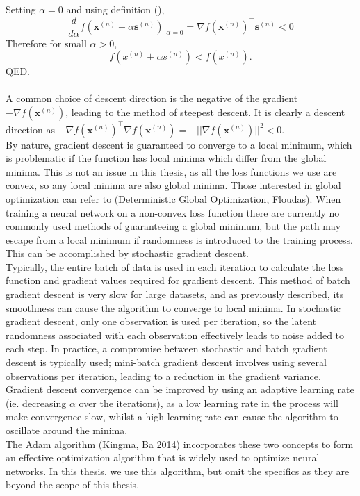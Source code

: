 \documentclass[a4paper,12pt]{article}
\numberwithin{equation}{section}
\begin{document}
Setting $\alpha=0$ and using definition (),
\[\frac{d}{d\alpha}f(\bm{x}^{(n)}+\alpha\bm{s}^{(n)})|_{\alpha=0}=\nabla f(\bm{x}^{(n)})^\top \bm{s}^{(n)}<0\]
Therefore for small $\alpha>0$,
\[f(x^{(n)}+\alpha s^{(n)})<f(x^{(n)}).\]
QED.\\
\\
A common choice of descent direction is the negative of the gradient $-\nabla f(\bm{x}^{(n)})$, leading to the method of steepest descent. It is clearly a descent direction as $-\nabla f(\bm{x}^{(n)})^\top\nabla f(\bm{x}^{(n)})=-||\nabla f(\bm{x}^{(n)})||^2<0$.\\
By nature, gradient descent is guaranteed to converge to a local minimum, which is problematic if the function has local minima which differ from the global minima. This is not an issue in this thesis, as all the loss functions we use are convex, so any local minima are also global minima. Those interested in global optimization can refer to (Deterministic Global Optimization, Floudas). When training a neural network on a non-convex loss function there are currently no commonly used methods of guaranteeing a global minimum, but the path may escape from a local minimum if randomness is introduced to the training process. This can be accomplished by stochastic gradient descent.\\
Typically, the entire batch of data is used in each iteration to calculate the loss function and gradient values required for gradient descent. This method of batch gradient descent is very slow for large datasets, and as previously described, its smoothness can cause the algorithm to converge to local minima. In stochastic gradient descent, only one observation is used per iteration, so the latent randomness associated with each observation effectively leads to noise added to each step. In practice, a compromise between stochastic and batch gradient descent is typically used; mini-batch gradient descent involves using several observations per iteration, leading to a reduction in the gradient variance.\\
Gradient descent convergence can be improved by using an adaptive learning rate (ie. decreasing $\alpha$ over the iterations), as a low learning rate in the process will make convergence slow, whilst a high learning rate can cause the algorithm to oscillate around the minima.\\
The Adam algorithm (Kingma, Ba 2014) incorporates these two concepts to form an effective optimization algorithm that is widely used to optimize neural networks. In this thesis, we use this algorithm, but omit the specifics as they are beyond the scope of this thesis.
\newpage
\end{document}

